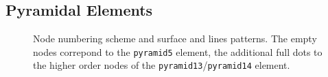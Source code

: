 \subsection{Pyramidal Elements}

\begin{figure}[h!]
\begin{center}
\caption{Node numbering scheme and surface and lines patterns. The empty nodes correpond to the \texttt{pyramid5} element, the additional full dots to the higher order nodes of the \texttt{pyramid13}/\texttt{pyramid14} element.}
\label{fig:conventions:pyramid}
\end{center}
\end{figure}





